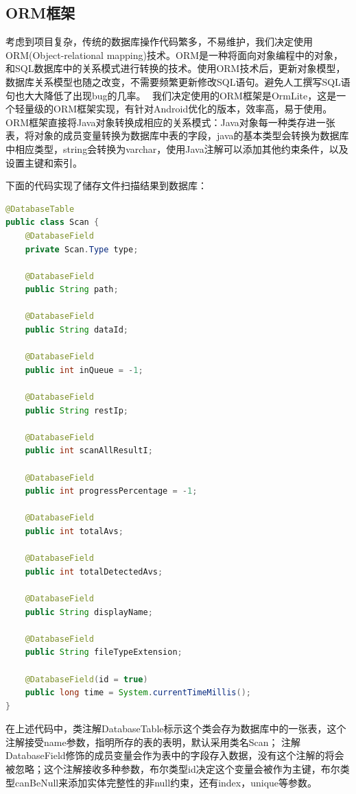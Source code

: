 \documentclass[format=final, language=chinese, degree=fyp]{hustthesis}
\begin{document}
\subsection{ORM框架}

考虑到项目复杂，传统的数据库操作代码繁多，不易维护，我们决定使用ORM(Object-relational mapping)技术。ORM是一种将面向对象编程中的对象，和SQL数据库中的关系模式进行转换的技术。使用ORM技术后，更新对象模型，数据库关系模型也随之改变，不需要频繁更新修改SQL语句。避免人工撰写SQL语句也大大降低了出现bug的几率。  我们决定使用的ORM框架是OrmLite，这是一个轻量级的ORM框架实现，有针对Android优化的版本，效率高，易于使用。 
	ORM框架直接将Java对象转换成相应的关系模式：Java对象每一种类存进一张表，将对象的成员变量转换为数据库中表的字段，java的基本类型会转换为数据库中相应类型，string会转换为varchar，使用Java注解可以添加其他约束条件，以及设置主键和索引。
	
	下面的代码实现了储存文件扫描结果到数据库：
	
	\begin{lstlisting}[language=java]
@DatabaseTable
public class Scan {
    @DatabaseField 
 	private Scan.Type type;
 	
    @DatabaseField
    public String path;

    @DatabaseField
    public String dataId;
    
    @DatabaseField
    public int inQueue = -1;
    
    @DatabaseField
    public String restIp;

    @DatabaseField
    public int scanAllResultI;
    
    @DatabaseField
    public int progressPercentage = -1;

    @DatabaseField
    public int totalAvs;

    @DatabaseField
    public int totalDetectedAvs;

    @DatabaseField
    public String displayName;

    @DatabaseField
    public String fileTypeExtension;
    
    @DatabaseField(id = true) 
    public long time = System.currentTimeMillis();
}
	\end{lstlisting}
	
	在上述代码中，类注解DatabaseTable标示这个类会存为数据库中的一张表，这个注解接受name参数，指明所存的表的表明，默认采用类名Scan；
	注解DatabaseField修饰的成员变量会作为表中的字段存入数据，没有这个注解的将会被忽略；这个注解接收多种参数，布尔类型id决定这个变量会被作为主键，布尔类型canBeNull来添加实体完整性的非null约束，还有index，unique等参数。
	
\end{document}
